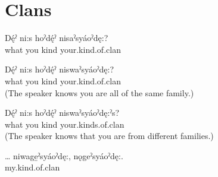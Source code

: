 \section{Clans} \label{clans}
\largerpage
\ea
\gll Dę́ˀ ni:s hoˀdę́ˀ nisaˀsyáoˀdę:?\\
what you kind your.kind.of.clan\\
\glt {}
\z

\ea 
\gll Dę́ˀ ni:s hoˀdę́ˀ niswaˀsyáoˀdę:?\\
what you kind your.kind.of.clan\\
\glt {} (The speaker knows you are all of the same family.)
\z 

\ea 
\gll Dę́ˀ ni:s hoˀdę́ˀ niswaˀsyáoˀdę:ˀs?\\
what you kind your.kinds.of.clan\\
\glt {} (The speaker knows that you are from different families.)
\z 

\ea 
\gll …  niwage̱ˀsyáoˀdę:, nǫgeˀsyáoˀdę:.\\
{} my.kind.of.clan {}\\
\glt {}
\z



